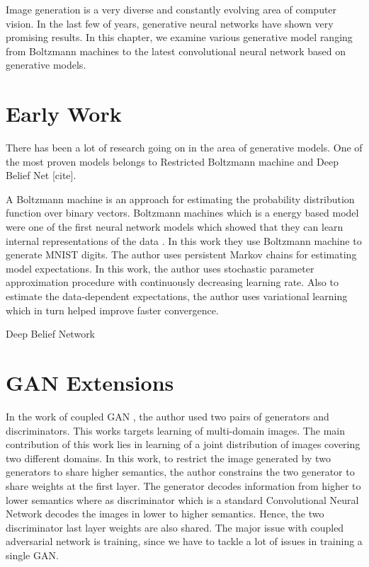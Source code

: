 \doublespacing
{} 
\label{chap:RelatedWork}

Image generation is a very diverse and constantly evolving area of computer vision. In the last few of years, generative neural networks have shown very promising results. In this chapter, we examine various generative model ranging from Boltzmann machines to the latest convolutional neural network based on generative models.
\section{Early Work}

There has been a lot of research going on in the area of generative models. One of the most proven models belongs to Restricted Boltzmann machine and Deep Belief Net [cite].

A Boltzmann machine is an approach for estimating the probability distribution function over binary vectors. Boltzmann machines which is  a energy based model were one of the first neural network models which showed that they can learn internal representations of the data \cite{Boltzman-Wiki}.
In this work they use Boltzmann machine to generate MNIST digits. The author uses persistent Markov chains for estimating model expectations. In this work, the author uses stochasti\label{chap:foo}c parameter approximation procedure with continuously decreasing learning rate. Also to estimate the data-dependent expectations, the author uses variational learning which in turn helped improve faster convergence. 

\par 

Deep Belief Network


\section{GAN Extensions}
In the work of coupled GAN \cite{Co-GAN}, the author used two pairs of generators and discriminators. This works targets learning of multi-domain images. The main contribution of this work lies in learning of a joint distribution of images covering two different domains. In this work, to restrict the image generated by two generators to share higher semantics, the author constrains the two generator to share weights at the first layer. The generator decodes information from higher to lower semantics where as discriminator which is a standard Convolutional Neural Network decodes the images in lower to higher semantics. Hence, the two discriminator last layer weights are also shared. The major issue with coupled adversarial network is training, since we have to tackle a lot of issues in training a single GAN.
\par

